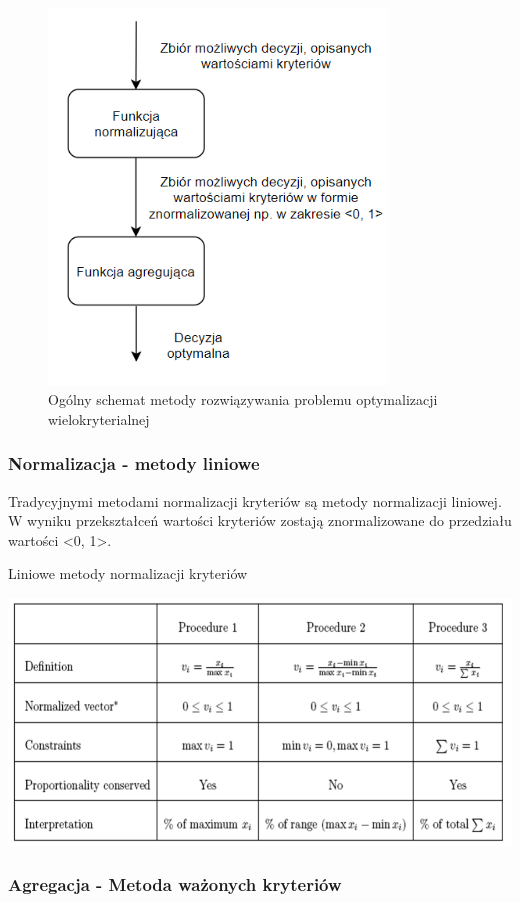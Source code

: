\documentclass[a4paper,11pt]{article}
\begin{document}
\begin{figure}[H]
\centering
\includegraphics[width=9cm]{tradycyjne-algorytmy-opt.PNG}
\caption{Ogólny schemat metody rozwiązywania problemu optymalizacji wielokryterialnej}
\end{figure}

\subsubsection{Normalizacja - metody liniowe}

Tradycyjnymi metodami normalizacji kryteriów są metody normalizacji liniowej. W wyniku przekształceń wartości kryteriów zostają znormalizowane do przedziału wartości <0, 1>.
\begin{table}[H]
\centering
\label{tbl:excel-table}
\caption{Liniowe metody normalizacji kryteriów \cite{pa}}
\includegraphics[width=15cm]{linear-normalization.PNG}
\end{table}


\subsubsection{Agregacja - Metoda ważonych kryteriów}
\end{document}
